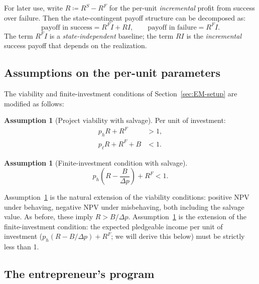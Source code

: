 \documentclass[11pt,a4paper,oneside]{book}
\theoremstyle{plain}
\theoremstyle{definition}
\newtheorem{assumption}[theorem]{Assumption}
\theoremstyle{remark}
\numberwithin{equation}{chapter}
\begin{document}
For later use, write $R \coloneqq R^S - R^F$ for the per-unit \emph{incremental} profit from success over failure.
Then the state-contingent payoff structure can be decomposed as:
\begin{equation}\label{eq:EM-decomposition}
  \text{payoff in success} = R^F I + R I, \qquad \text{payoff in failure} = R^F I.
\end{equation}
The term $R^F I$ is a \emph{state-independent} baseline; the term $R I$ is the \emph{incremental} success payoff that depends on the realization.

\subsection{Assumptions on the per-unit parameters}

The viability and finite-investment conditions of Section~\ref{sec:EM-setup} are modified as follows:

\begin{assumption}[Project viability with salvage]\label{ass:EM-collateral-viability}
Per unit of investment:
\begin{align}
  p_h R + R^F &> 1, \tag{V.1''}\label{eq:EM-col-NPV-h} \\
  p_\ell R + R^F + B &< 1. \tag{V.2''}\label{eq:EM-col-NPV-l}
\end{align}
\end{assumption}

\begin{assumption}[Finite-investment condition with salvage]\label{ass:EM-collateral-finite}
\begin{equation}\label{eq:EM-col-finite}
  p_h \left( R - \frac{B}{\Delta p} \right) + R^F < 1.
\end{equation}
\end{assumption}

Assumption~\ref{ass:EM-collateral-viability} is the natural extension of the viability conditions: positive NPV under behaving, negative NPV under misbehaving, both including the salvage value.
As before, these imply $R > B/\Delta p$.
Assumption~\ref{ass:EM-collateral-finite} is the extension of the finite-investment condition: the expected pledgeable income per unit of investment ($p_h(R - B/\Delta p) + R^F$; we will derive this below) must be strictly less than 1.

\subsection{The entrepreneur's program}
\end{document}
